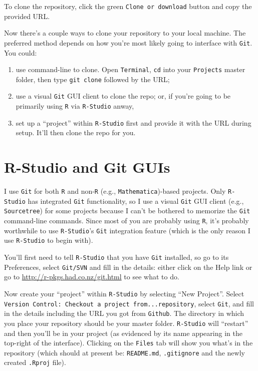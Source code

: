 \documentclass[12pt,letterpaper]{article}
\begin{document}
To clone the repository, click the green \texttt{Clone or download} button and copy the provided URL.

Now there's a couple ways to clone your repository to your local machine.  The preferred method depends on how you're most likely going to interface with \texttt{Git}.  You could:
\begin{enumerate}
	\item use command-line to clone.  Open \texttt{Terminal}, \texttt{cd} into your \texttt{Projects} master folder, then type \texttt{git clone} followed by the URL;
	\item use a visual \texttt{Git} GUI client to clone the repo;
	or, if you're going to be primarily using \texttt{R} via \texttt{R-Studio} anway,
	\item set up a ``project'' within \texttt{R-Studio} first and provide it with the URL during setup.  It'll then clone the repo for you.
\end{enumerate}

\section{R-Studio and Git GUIs}
I use \texttt{Git} for both \texttt{R} and non-\texttt{R} (e.g.,  \texttt{Mathematica})-based projects.  Only  \texttt{R-Studio} has integrated  \texttt{Git} functionality, so I use a visual  \texttt{Git} GUI client (e.g., \texttt{Sourcetree}) for some projects because I can't be bothered to memorize the  \texttt{Git} command-line commands.  Since most of you are probably using \texttt{R}, it's probably worthwhile to use \texttt{R-Studio}'s  \texttt{Git} integration feature (which is the only reason I use  \texttt{R-Studio} to begin with).

You'll first need to tell  \texttt{R-Studio} that you have \texttt{Git} installed, so go to its Preferences, select \texttt{Git/SVN} and fill in the details: either click on the Help link or go to
\url{http://r-pkgs.had.co.nz/git.html} to see what to do.

Now create your ``project'' within  \texttt{R-Studio} by selecting ``New Project''.  Select \texttt{Version Control: Checkout a project from...repository}, select \texttt{Git}, and fill in the details including the URL you got from \texttt{Github}.  The directory in which you place your repository should be your master folder.   \texttt{R-Studio} will ``restart'' and then you'll be in your project (as evidenced by its name appearing in the top-right of the interface).  Clicking on the \texttt{Files} tab will show you what's in the repository (which should at present be: \texttt{README.md}, \texttt{.gitignore} and the newly created \texttt{.Rproj} file).
\end{document}
